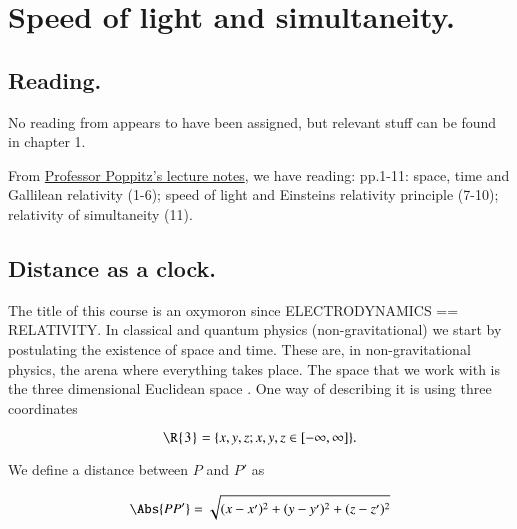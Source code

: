 %
%

\chapter{Speed of light and simultaneity.}
\label{chap:relativisticElectrodynamicsL1}
{}
\date{Jan 11, 2011}

\beginArtNoToc

\section{Reading.}

No reading from \cite{landau1980classical} appears to have been assigned, but relevant stuff can be found in chapter 1.

From \href{http://www.physics.utoronto.ca/~poppitz/e-poppitz/PHY450_files/RelEMp1-11.pdf}{Professor Poppitz's lecture notes}, we have reading: pp.1-11: space, time and Gallilean relativity (1-6); speed of light and Einsteins relativity principle (7-10); relativity of simultaneity (11).

\section{Distance as a clock.}

The title of this course is an oxymoron since ELECTRODYNAMICS == RELATIVITY.  In classical and quantum physics (non-gravitational) we start by postulating the existence of space and time.  These are, in non-gravitational physics, the arena where everything takes place.  The space that we work with is the three dimensional Euclidean space .  One way of describing it is using three coordinates

\begin{equation}\label{eqn:relativisticElectrodynamicsL1:10}
\text{\R{3}} = \{ x, y, z ; x,y,z \in [-\infty,\infty] \}.
\end{equation}

We define a distance between $P$ and $P'$ as

\begin{equation}\label{eqn:relativisticElectrodynamicsL1:20}
\Abs{P P' } = \sqrt{ (x-x')^2 + (y-y')^2 + (z-z')^2 }
\end{equation}

